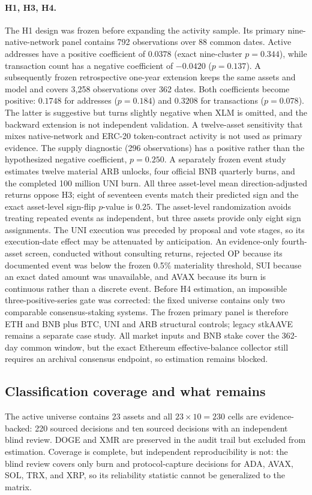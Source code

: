 \documentclass[10pt]{article}
\begin{document}
\paragraph{H1, H3, H4.} The H1 design was frozen before expanding the activity sample. Its primary nine-native-network panel contains 792 observations over 88 common dates. Active addresses have a positive coefficient of $0.0378$ (exact nine-cluster $p=0.344$), while transaction count has a negative coefficient of $-0.0420$ ($p=0.137$). A subsequently frozen retrospective one-year extension keeps the same assets and model and covers 3,258 observations over 362 dates. Both coefficients become positive: $0.1748$ for addresses ($p=0.184$) and $0.3208$ for transactions ($p=0.078$). The latter is suggestive but turns slightly negative when XLM is omitted, and the backward extension is not independent validation. A twelve-asset sensitivity that mixes native-network and ERC-20 token-contract activity is not used as primary evidence. The supply diagnostic (296 observations) has a positive rather than the hypothesized negative coefficient, $p = 0.250$. A separately frozen event study estimates twelve material ARB unlocks, four official BNB quarterly burns, and the completed 100 million UNI burn. All three asset-level mean direction-adjusted returns oppose H3; eight of seventeen events match their predicted sign and the exact asset-level sign-flip $p$-value is $0.25$. The asset-level randomization avoids treating repeated events as independent, but three assets provide only eight sign assignments. The UNI execution was preceded by proposal and vote stages, so its execution-date effect may be attenuated by anticipation. An evidence-only fourth-asset screen, conducted without consulting returns, rejected OP because its documented event was below the frozen 0.5\% materiality threshold, SUI because an exact dated amount was unavailable, and AVAX because its burn is continuous rather than a discrete event. Before H4 estimation, an impossible three-positive-series gate was corrected: the fixed universe contains only two comparable consensus-staking systems. The frozen primary panel is therefore ETH and BNB plus BTC, UNI and ARB structural controls; legacy stkAAVE remains a separate case study. All market inputs and BNB stake cover the 362-day common window, but the exact Ethereum effective-balance collector still requires an archival consensus endpoint, so estimation remains blocked.

\subsection{Classification coverage and what remains}
The active universe contains 23 assets and all $23 \times 10 = 230$ cells are evidence-backed: 220 sourced decisions and ten sourced decisions with an independent blind review. DOGE and XMR are preserved in the audit trail but excluded from estimation. Coverage is complete, but independent reproducibility is not: the blind review covers only burn and protocol-capture decisions for ADA, AVAX, SOL, TRX, and XRP, so its reliability statistic cannot be generalized to the matrix.
\end{document}
